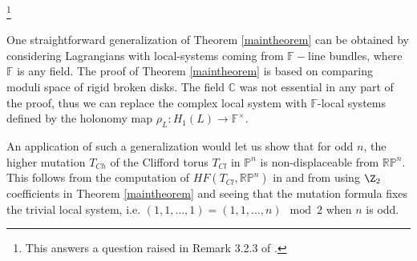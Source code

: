 \begin{remark}\footnote{This answers a question raised in Remark 3.2.3  of \cite{kawashelu}.}
    
One straightforward generalization of Theorem \ref{maintheorem} can be obtained by considering Lagrangians with local-systems coming from $\mathbb{F}-$line bundles, where $\mathbb{F}$ is any field. The proof of Theorem \ref{maintheorem} is based on comparing moduli space of rigid broken disks. The field $\mathbb{C}$ was not essential in any part of the proof, thus we can replace the complex local system with $\mathbb{F}$-local systems defined by the holonomy map $\rho_L: H_1(L) \to \mathbb{F}^\times $.

An application of such a generalization would let us show that for odd $n$, the higher mutation $T_{Ch}$ of the Clifford torus $T_{Cl}$ in $\mathbb{P}^n$ is non-displaceable from $\mathbb{RP}^n$. This follows from the computation of $HF(T_{Cl},\mathbb{RP}^n)$ in \cite{alston} and  from using $\Z_2$ coefficients in Theorem \ref{maintheorem} and seeing that the mutation formula 
 fixes the trivial local system, i.e. $(1,1,\dots, 1) = (1,1,\dots, n) \mod 2$ when $n$ is odd. 
\end{remark}